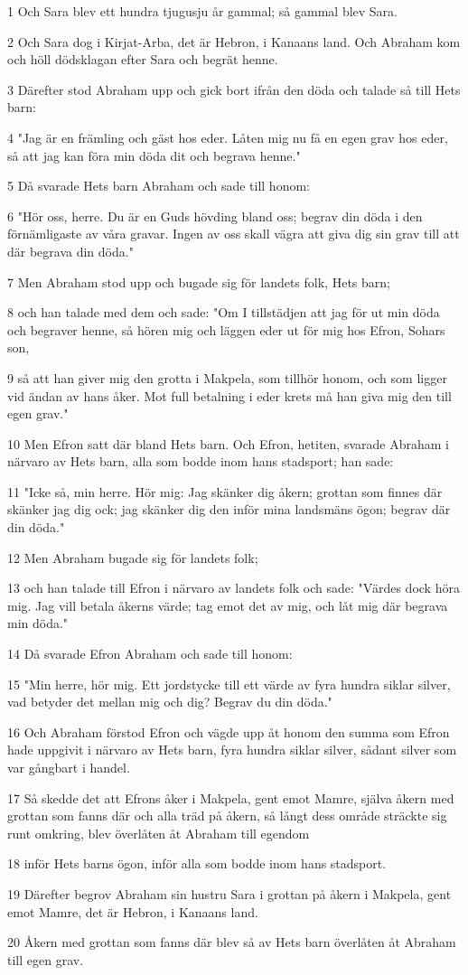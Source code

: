 \par 1 Och Sara blev ett hundra tjugusju år gammal; så gammal blev Sara.
\par 2 Och Sara dog i Kirjat-Arba, det är Hebron, i Kanaans land. Och Abraham kom och höll dödsklagan efter Sara och begrät henne.
\par 3 Därefter stod Abraham upp och gick bort ifrån den döda och talade så till Hets barn:
\par 4 "Jag är en främling och gäst hos eder. Låten mig nu få en egen grav hos eder, så att jag kan föra min döda dit och begrava henne."
\par 5 Då svarade Hets barn Abraham och sade till honom:
\par 6 "Hör oss, herre. Du är en Guds hövding bland oss; begrav din döda i den förnämligaste av våra gravar. Ingen av oss skall vägra att giva dig sin grav till att där begrava din döda."
\par 7 Men Abraham stod upp och bugade sig för landets folk, Hets barn;
\par 8 och han talade med dem och sade: "Om I tillstädjen att jag för ut min döda och begraver henne, så hören mig och läggen eder ut för mig hos Efron, Sohars son,
\par 9 så att han giver mig den grotta i Makpela, som tillhör honom, och som ligger vid ändan av hans åker. Mot full betalning i eder krets må han giva mig den till egen grav."
\par 10 Men Efron satt där bland Hets barn. Och Efron, hetiten, svarade Abraham i närvaro av Hets barn, alla som bodde inom hans stadsport; han sade:
\par 11 "Icke så, min herre. Hör mig: Jag skänker dig åkern; grottan som finnes där skänker jag dig ock; jag skänker dig den inför mina landsmäns ögon; begrav där din döda."
\par 12 Men Abraham bugade sig för landets folk;
\par 13 och han talade till Efron i närvaro av landets folk och sade: "Värdes dock höra mig. Jag vill betala åkerns värde; tag emot det av mig, och låt mig där begrava min döda."
\par 14 Då svarade Efron Abraham och sade till honom:
\par 15 "Min herre, hör mig. Ett jordstycke till ett värde av fyra hundra siklar silver, vad betyder det mellan mig och dig? Begrav du din döda."
\par 16 Och Abraham förstod Efron och vägde upp åt honom den summa som Efron hade uppgivit i närvaro av Hets barn, fyra hundra siklar silver, sådant silver som var gångbart i handel.
\par 17 Så skedde det att Efrons åker i Makpela, gent emot Mamre, själva åkern med grottan som fanns där och alla träd på åkern, så långt dess område sträckte sig runt omkring, blev överlåten åt Abraham till egendom
\par 18 inför Hets barns ögon, inför alla som bodde inom hans stadsport.
\par 19 Därefter begrov Abraham sin hustru Sara i grottan på åkern i Makpela, gent emot Mamre, det är Hebron, i Kanaans land.
\par 20 Åkern med grottan som fanns där blev så av Hets barn överlåten åt Abraham till egen grav.

